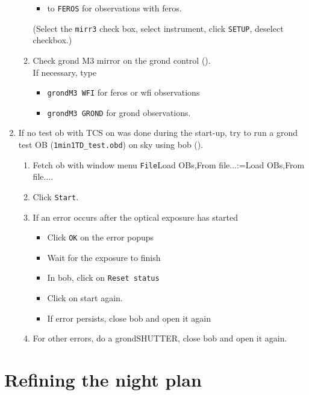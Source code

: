 \documentclass[11pt,fleqn,a4paper]{book}
\makeatletter
\def\menu#1#2{\texttt{#1}\ifx{}#2\else\@for\@x:=#2\do{$\rightarrow$\texttt{\@x}}\fi}
\def\wmenu#1#2{window menu \menu{#1}{#2}}
\def\fetchob{\wmenu{File}{Load OBs,From file...}}
\makeatother
\begin{document}
\begin{enumerate}
\begin{enumerate}
\begin{itemize}
                \item to \texttt{FEROS} for observations with \gls{feros}.
              \end{itemize}
              (Select the \texttt{\gls{mirr3}} check box, select instrument, click \texttt{SETUP}, deselect checkbox.)
        \item Check \gls{grond} \gls{M3} mirror on the \gls{grond} control ().\\
              If necessary, type 
              \begin{itemize}
                  \item \texttt{\gls{grondM3} WFI} for \gls{feros} or \gls{wfi} observations
                  \item \texttt{\gls{grondM3} GROND} for \gls{grond} observations.
              \end{itemize}
     \end{enumerate}
  \item If no test \gls{ob} with TCS on was done during the start-up, try to run a \gls{grond} test OB (\texttt{1min1TD\_test.obd}) on sky using \gls{bob} ().
     \begin{enumerate}
       \item Fetch \gls{ob} with \fetchob.
       \item Click \texttt{Start}.      
       \item If an error occurs after the optical exposure has started
             \begin{itemize}
                \item Click \texttt{OK} on the error popups
                \item Wait for the exposure to finish
                \item In \gls{bob}, click on \texttt{Reset status}
                \item Click on start again.
                \item If error persists, close \gls{bob} and open it again
             \end{itemize} 
       \item For other errors, do a \gls{grondSHUTTER}, close bob and open it again.
     \end{enumerate}
\end{enumerate}

\section{Refining the night plan}
\end{document}
